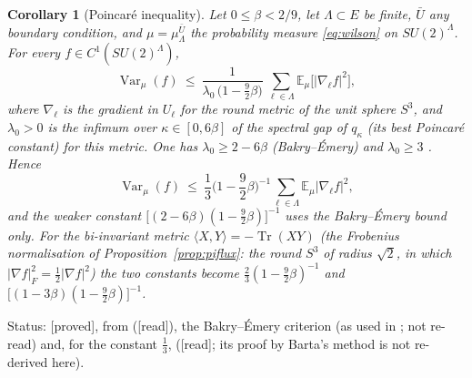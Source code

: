 \documentclass[11pt,a4paper]{article}
\newtheorem{corollary}[theorem]{Corollary}
\theoremstyle{remark}
\theoremstyle{definition}
\theoremstyle{plain}
\theoremstyle{remark}
\newcommand{\E}{\mathbb{E}}
\newcommand{\Var}{\operatorname{Var}}
\newcommand{\st}[1]{\textsf{[#1]}}
\begin{document}
\begin{corollary}[Poincar\'e inequality]\label{cor:poincare}
Let $0\le\beta<2/9$, let $\Lambda\subset E$ be finite, $\bar U$ any boundary condition, and $\mu=\mu^{\bar U}_\Lambda$ the probability measure \eqref{eq:wilson} on $SU(2)^\Lambda$.
For every $f\in C^1(SU(2)^\Lambda)$,
\[
\Var_\mu(f)\ \le\ \frac{1}{\lambda_0\,\big(1-\frac92\beta\big)}\ \sum_{\ell\in\Lambda}\E_\mu\big[|\nabla_\ell f|^2\big],
\]
where $\nabla_\ell$ is the gradient in $U_\ell$ for the round metric of the unit sphere $S^3$, and $\lambda_0>0$ is the infimum over $\kappa\in[0,6\beta]$ of the spectral gap
of $q_\kappa$ (its best Poincar\'e constant) for this metric. One has $\lambda_0\ge2-6\beta$ (Bakry--\'Emery) and $\lambda_0\ge3$ \cite[Lemma~4 of v1, Lemma~122 of v4]{BB26}. Hence
\[
\Var_\mu(f)\ \le\ \frac13\Big(1-\frac92\beta\Big)^{-1}\sum_{\ell\in\Lambda}\E_\mu|\nabla_\ell f|^2 ,
\]
and the weaker constant $\big[(2-6\beta)(1-\tfrac92\beta)\big]^{-1}$ uses the Bakry--\'Emery bound only. For the bi-invariant metric $\langle X,Y\rangle=-\operatorname{Tr}(XY)$
(the Frobenius normalisation of Proposition~\ref{prop:piflux}: the round $S^3$ of radius $\sqrt2$, in which $|\nabla f|_F^2=\tfrac12|\nabla f|^2$) the two constants become
$\tfrac23(1-\tfrac92\beta)^{-1}$ and $\big[(1-3\beta)(1-\tfrac92\beta)\big]^{-1}$.
\end{corollary}
\noindent Status: \st{proved}, from \cite[Thm~2.1]{Wu06} (\st{read}), the Bakry--\'Emery criterion \cite{BE85} (as used in \cite[proof of Lemma~5.4]{Wu06}; not re-read) and, for the constant $\frac13$,
\cite[Lemma~4]{BB26} (\st{read}; its proof by Barta's method is not re-derived here).
\end{document}
